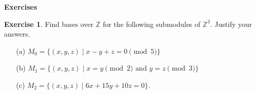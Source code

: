 \documentclass{amsart}
\newcommand{\Z}         {{\mathbb{Z}}}
\newcommand{\st}        {\;|\;}
\newcommand{\ip}[1]     {\langle #1\rangle}
\renewcommand{\:}{\colon}
\theoremstyle{definition}
\newtheorem{exercise}{Exercise}[section]
\begin{document}

\begin{center}
 \Large \textbf{Exercises}
\end{center}

\begin{exercise}
 Find bases over $\Z$ for the following submodules of $\Z^3$.  Justify
 your answers.
 \begin{itemize}
  \item[(a)] $M_0=\{(x,y,z)\st x-y+z=0\pmod{5}\}$
  \item[(b)] $M_1=\{(x,y,z)\st x=y\pmod{2} \text{ and } y=z\pmod{3}\}$
  \item[(c)] $M_2=\{(x,y,z)\st 6x+15y+10z=0\}$. 
 \end{itemize}
\end{exercise}
\end{document}
